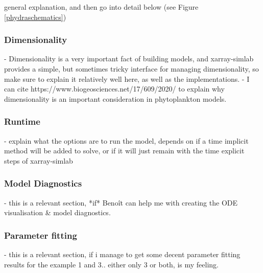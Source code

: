 \documentclass[template.tex]{subfiles}
\begin{document}
general explanation, and then go into detail below (see Figure \ref{phydraschematics})

\subsubsection{Dimensionality}
- Dimensionality is a very important fact of building models, and xarray-simlab provides a simple, but sometimes tricky interface for managing dimensionality, so make sure to explain it relatively well here, as well as the implementations.
- I can cite https://www.biogeosciences.net/17/609/2020/ to explain why dimensionality is an important consideration in phytoplankton models.

\subsubsection{Runtime}
- explain what the options are to run the model, depends on if a time implicit method will be added to solve, or if it will just remain with the time explicit steps of xarray-simlab

\subsubsection{Model Diagnostics}
- this is a relevant section, *if* Benoît can help me with creating the ODE visualisation & model diagnostics.

\subsubsection{Parameter fitting}
- this is a relevant section, if i manage to get some decent parameter fitting results for the example 1 and 3.. either only 3 or both, is my feeling. 
\end{document}
